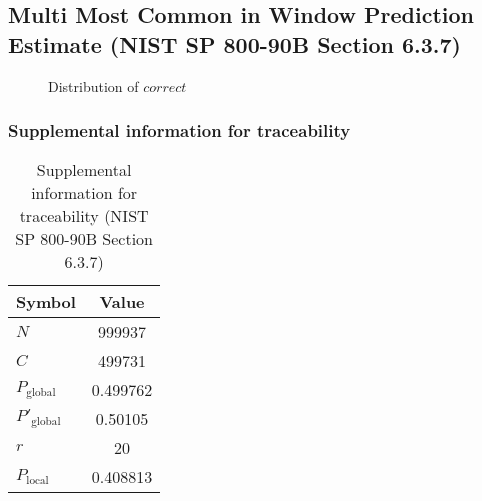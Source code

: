\documentclass[a3paper,xelatex,english]{bxjsarticle}
\begin{document}
\subsection{Multi Most Common in Window Prediction Estimate (NIST SP 800-90B Section 6.3.7)}\label{sec:Binary637}

\begin{figure}[htbp]
\centering

\caption{Distribution of $correct$}
\end{figure}
\subsubsection{Supplemental information for traceability}
\renewcommand{\arraystretch}{1.8}
\begin{table}[h]
\caption{Supplemental information for traceability (NIST SP 800-90B Section 6.3.7)}
\begin{center}
\begin{tabular}{|l|c|}
\hline 
\rowcolor{anotherlightblue} %
Symbol				& Value \\ \hline 
$N$				& 999937\\ \hline 
$C$				& 499731\\ \hline 
$P_{\textrm{global}}$				& 0.499762\\ \hline 
$P'_{\textrm{global}}$			&  0.50105\\ \hline 
$r$				& 20\\ \hline 
$P_{\textrm{local}}$ 			& 0.408813\\ \hline
\end{tabular}
\end{center}
\end{table}
\renewcommand{\arraystretch}{1.4}
\clearpage
\end{document}

